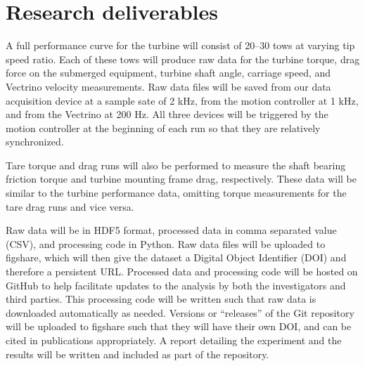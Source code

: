 \documentclass{article}
\begin{document}
\section{Research deliverables}

A full performance curve for the turbine will consist of 20--30 tows at varying
tip speed ratio. Each of these tows will produce raw data for the turbine
torque, drag force on the submerged equipment, turbine shaft angle, carriage
speed, and Vectrino velocity measurements. Raw data files will be saved from our
data acquisition device at a sample sate of 2 kHz, from the motion controller at
1 kHz, and from the Vectrino at 200 Hz. All three devices will be triggered by
the motion controller at the beginning of each run so that they are relatively
synchronized.

Tare torque and drag runs will also be performed to measure the shaft bearing
friction torque and turbine mounting frame drag, respectively. These data will
be similar to the turbine performance data, omitting torque measurements for the
tare drag runs and vice versa.

Raw data will be in HDF5 format, processed data in comma separated value (CSV),
and processing code in Python. Raw data files will be uploaded to figshare,
which will then give the dataset a Digital Object Identifier (DOI) and therefore
a persistent URL. Processed data and processing code will be hosted on GitHub to
help facilitate updates to the analysis by both the investigators and third
parties. This processing code will be written such that raw data is downloaded
automatically as needed. Versions  or ``releases'' of the Git repository will be
uploaded to figshare such that they will have their own DOI, and can be cited in
publications appropriately. A report detailing the experiment and the results
will be written and included as part of the repository.



\end{document}
